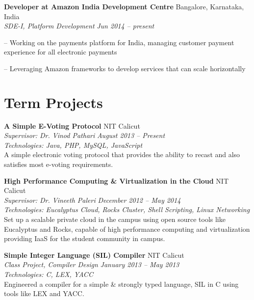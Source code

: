 \documentclass[margin,line]{resume}
\begin{document}
\begin{resume}
    \vspace{2mm}
    
     \textbf{Developer at Amazon India Development Centre} \hfill Bangalore, Karnataka, India
	 \\
     \textit{SDE-I, Platform Development} \hfill \textit{Jun 2014 -- present}

     \begin{compactitem}
        \item[--] Working on the payments platform for India, managing customer payment experience for all electronic payments
        \item[--] Leveraging Amazon frameworks to develop services that can scale horizontally
    \end{compactitem}
    
    \vspace{2mm}%

    \section{\mysidestyle Term Projects}

	
    \textbf{A Simple E-Voting Protocol} 				\hfill NIT Calicut 
    \\
    \textit{Supervisor: Dr. Vinod Pathari } 			\hfill \textit{August 2013 -- Present}
    \\
    \textit{Technologies: Java, PHP, MySQL, JavaScript}
    \\
    A simple electronic voting protocol that provides the ability to recast and also satisfies most e-voting requirements.
    
    \textbf{High Performance Computing \& Virtualization in the Cloud} 				\hfill NIT Calicut
    \\
    \textit{Supervisor: Dr. Vineeth Paleri } 			\hfill \textit{December 2012 -- May 2014}
    \\
    \textit{Technologies: Eucalyptus Cloud, Rocks Cluster, Shell Scripting, Linux Networking}
    \\
    Set up a scalable private cloud in the campus using open source tools like Eucalyptus and Rocks,
capable of high performance computing and virtualization providing IaaS for the student community in campus.
	
	\vspace{2mm}%

	\textbf{Simple Integer Language (SIL) Compiler} 						\hfill NIT Calicut
	\\
    \textit{Class Project, Compiler Design} 	\hfill \textit{January 2013 -- May 2013}
    \\
    \textit{Technologies: C, LEX, YACC}
    \\
	Engineered a compiler for a simple \& strongly typed language, SIL in C using tools like LEX and YACC.
  

\end{resume}
\end{document}
